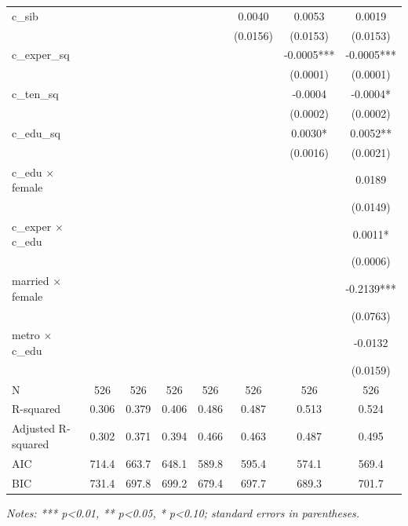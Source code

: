 \begin{table}[htbp]
\begin{tabular}{lccccccc}
c\_sib &  &  &  &  & 0.0040 & 0.0053 & 0.0019 \\
 &  &  &  &  & (0.0156) & (0.0153) & (0.0153) \\
c\_exper\_sq &  &  &  &  &  & -0.0005*** & -0.0005*** \\
 &  &  &  &  &  & (0.0001) & (0.0001) \\
c\_ten\_sq &  &  &  &  &  & -0.0004 & -0.0004* \\
 &  &  &  &  &  & (0.0002) & (0.0002) \\
c\_edu\_sq &  &  &  &  &  & 0.0030* & 0.0052** \\
 &  &  &  &  &  & (0.0016) & (0.0021) \\
c\_edu $\times$ female &  &  &  &  &  &  & 0.0189 \\
 &  &  &  &  &  &  & (0.0149) \\
c\_exper $\times$ c\_edu &  &  &  &  &  &  & 0.0011* \\
 &  &  &  &  &  &  & (0.0006) \\
married $\times$ female &  &  &  &  &  &  & -0.2139*** \\
 &  &  &  &  &  &  & (0.0763) \\
metro $\times$ c\_edu &  &  &  &  &  &  & -0.0132 \\
 &  &  &  &  &  &  & (0.0159) \\
\hline
N & 526 & 526 & 526 & 526 & 526 & 526 & 526 \\
R-squared & 0.306 & 0.379 & 0.406 & 0.486 & 0.487 & 0.513 & 0.524 \\
Adjusted R-squared & 0.302 & 0.371 & 0.394 & 0.466 & 0.463 & 0.487 & 0.495 \\
AIC & 714.4 & 663.7 & 648.1 & 589.8 & 595.4 & 574.1 & 569.4 \\
BIC & 731.4 & 697.8 & 699.2 & 679.4 & 697.7 & 689.3 & 701.7 \\
\hline\hline
\end{tabular}
\end{table}

\textit{Notes: *** p<0.01, ** p<0.05, * p<0.10; standard errors in parentheses.}